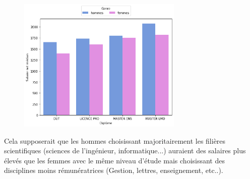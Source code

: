 \documentclass[12pt, a4paper, titlepage, table]{article}
\begin{document}
	\begin{figure}[H]
		\centering
		\includegraphics[width=0.7\textwidth]{../graphs/salaires_medians_genre.png}
		\label{fig:salaire_median_genre}
	\end{figure}
	Cela supposerait que les hommes choisissant majoritairement les filières scientifiques (sciences de l'ingénieur, informatique...) auraient des salaires plus élevés que les femmes avec le même niveau d'étude mais choisissant des disciplines moins rémunératrices (Gestion, lettres, enseignement, etc..).
	
\end{document}
